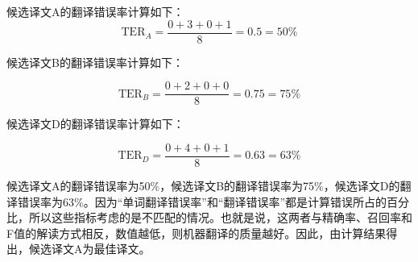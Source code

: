 \documentclass[output=paper]{langscibook}
\begin{document}
候选译文A的翻译错误率计算如下：
\begin{equation}
\text{TER}_A=\frac{0+3+0+1}{8}=0.5=50\%
\end{equation}



\begin{table}[H]
\caption{候选译文B变成参考译文所需的操作步骤}
\label{tab:rossi:6}
\end{table}

候选译文B的翻译错误率计算如下：

\begin{equation}
\text{TER}_B=\frac{0+2+0+0}{8}=0.75=75\%
\end{equation}



\begin{table}[H]
\caption{候选译文D变成参考译文所需的操作步骤}
\label{tab:rossi:7}
\end{table}

候选译文D的翻译错误率计算如下：

\begin{equation}
\text{TER}_D=\frac{0+4+0+1}{8}=0.63=63\%
\end{equation}

候选译文A的翻译错误率为50\%，候选译文B的翻译错误率为75\%，候选译文D的翻译错误率为63\%。因为“单词翻译错误率”和“翻译错误率”都是计算错误所占的百分比，所以这些指标考虑的是不匹配的情况。也就是说，这两者与精确率、召回率和F值的解读方式相反，数值越低，则机器翻译的质量越好。因此，由计算结果得出，候选译文A为最佳译文。
\end{document}
